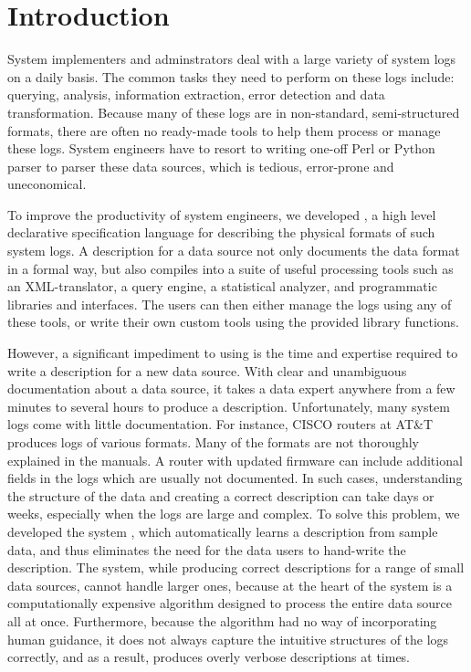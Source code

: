 \section{Introduction}
\label{sec:intro}

System implementers and adminstrators deal with a large variety of system logs on a
daily basis. The common tasks they need to perform on these logs include: querying,
analysis, information extraction, error detection and data transformation.
Because many of these logs are in non-standard, semi-structured formats,
there are often no ready-made tools to help them process or manage these logs.
System engineers have to resort to writing one-off
Perl or Python parser to parser these data sources, which is tedious,
error-prone and uneconomical. 

To improve the productivity of system engineers, we developed \pads
\cite{fisher+:pads,fisher+:popl06,mandelbaum+:pads-ml,padsweb},
a high level declarative specification language for describing the
physical formats of such system logs. A \pads{} description for a data
source not only documents the data format in a formal way, but also
compiles into a suite of useful processing tools such as an XML-translator,
a query engine, a statistical analyzer, and programmatic
libraries and interfaces. The users can then either manage the logs using
any of these tools, or write their own custom tools using the provided 
library functions. 

However, a significant impediment to using \pads{} is the time and 
expertise required to write a \pads{} description for a new data source.
With clear and unambiguous documentation about a data source, it takes a data 
expert anywhere from a few minutes to several hours to produce a description. 
Unfortunately, many system logs come with little documentation.
For instance, CISCO routers at AT\&T produces logs of various formats. Many of
the formats are not thoroughly explained in the manuals. A router
with updated firmware can include additional fields in the logs which 
are usually not documented. 
In such cases, understanding the structure of the data and creating a correct
description can take days or weeks, especially when the logs are large and complex.
To solve this problem, we developed the \learnpads{} system
\cite{Fisher+:dirttoshovels,fisher+:sigmod08,xi08:tokenization}, which automatically
learns a \pads{} description from sample data, and thus eliminates the need
for the data users to hand-write the description. The \learnpads{} system,
while producing correct descriptions for a range of small data sources,
cannot handle larger ones, because at the heart of the system is a
computationally expensive algorithm designed to process the entire data source all
at once. Furthermore, because the algorithm had no way of incorporating human guidance, 
it does not always capture the intuitive structures of the logs
correctly, and as a result, produces overly verbose descriptions at times.

